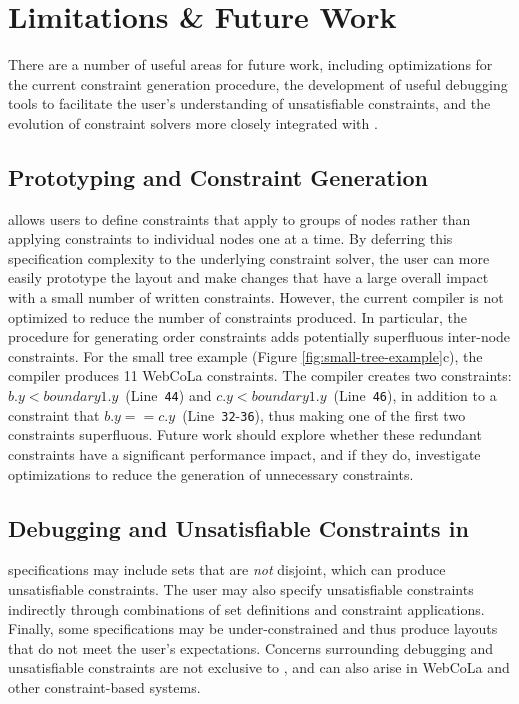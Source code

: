 \section{Limitations \& Future Work}
There are a number of useful areas for future work, including optimizations
for the current constraint generation procedure, the development of useful debugging
tools to facilitate the user's understanding of unsatisfiable constraints,
and the evolution of constraint solvers more closely integrated with \projectname.


\vspace{-5px}
\subsection{Prototyping and Constraint Generation}
\projectname allows users to define constraints that apply
to groups of nodes rather than applying constraints to individual
nodes one at a time. By deferring this specification complexity to the underlying constraint
solver, the user can more easily prototype the layout and make changes that
have a large overall impact with a small number of written constraints. However, 
the current \projectname compiler is not optimized to reduce the
number of constraints produced. In particular, the procedure for generating
order constraints adds potentially superfluous inter-node 
constraints. For the small tree example (Figure \ref{fig:small-tree-example}c), 
the \projectname compiler produces 11 WebCoLa constraints.
The \projectname compiler creates two constraints: \mbox{$b.y < boundary1.y$ (Line~\texttt{44})} 
and \mbox{$c.y < boundary1.y$ (Line~\texttt{46})}, in addition to a
constraint that \mbox{$b.y == c.y$ (Line~\texttt{32}-\texttt{36})}, thus 
making one of the first two constraints superfluous. 
Future work should explore whether these redundant constraints have a 
significant performance impact, and if they do, investigate 
optimizations to reduce the generation of unnecessary constraints.

\vspace{-7px}
\subsection{Debugging and Unsatisfiable Constraints in \projectname}
\projectname specifications may include sets that 
are \emph{not} disjoint, which can produce unsatisfiable constraints. 
The user may also specify unsatisfiable constraints indirectly through
combinations of set definitions and constraint applications. 
Finally, some specifications may be under-constrained and thus produce
layouts that do not meet the user's expectations. Concerns surrounding
debugging and unsatisfiable constraints are not exclusive to \projectname, 
and can also arise in WebCoLa and other constraint-based systems. 

